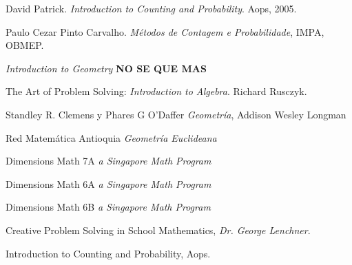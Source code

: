 \documentclass[letterpaper,11pt,oneside]{book}
\theoremstyle{definition}
\theoremstyle{remark}
\begin{document}
	\begin{thebibliography}{9}
		David Patrick. \textit{Introduction to Counting and Probability}. Aops, 2005.
		
		Paulo Cezar Pinto Carvalho. \textit{M\'etodos de Contagem e Probabilidade}, IMPA, OBMEP.
		
		\textit{Introduction to Geometry} \textbf{NO SE QUE MAS}
		
		The Art of Problem Solving:\textit{ Introduction to Algebra}. Richard Rusczyk.
		
		Standley R. Clemens y Phares G O'Daffer \textit{Geometr\'ia}, Addison Wesley Longman
		
		Red Matem\'atica Antioquia \textit{Geometr\'ia Euclideana}
		
		Dimensions Math 7A \textit{a Singapore Math Program} 
		
		Dimensions Math 6A \textit{a Singapore Math Program} 
		
		Dimensions Math 6B \textit{a Singapore Math Program} 
		
		Creative Problem Solving in School Mathematics, \textit{Dr. George Lenchner}. 
		
		Introduction to Counting and Probability, Aops.
		
	\end{thebibliography}
	

		
		
\end{document}
